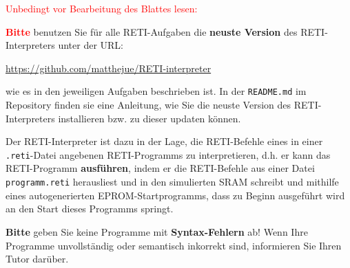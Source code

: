 \documentclass{article}
\newenvironment{adjustedminipage}[1]
{\vspace{0.1cm}\begin{minipage}[t]{#1}}
  {\end{minipage}\vspace{0.1cm}}
\begin{document}
\textcolor{red}{Unbedingt vor Bearbeitung des Blattes lesen:}

{\LARGE\bfseries\textcolor{red}{Bitte}} benutzen Sie für alle RETI-Aufgaben die \textbf{neuste Version} des RETI-Interpreters unter der URL:

\begin{center}
	\begin{adjustedminipage}{0.9\textwidth}
    \url{https://github.com/matthejue/RETI-interpreter}
	\end{adjustedminipage}
\end{center}

\sloppy

wie es in den jeweiligen Aufgaben beschrieben ist. In der \verb|README.md| im Repository finden sie eine Anleitung, wie Sie die neuste Version des RETI-Interpreters installieren bzw. zu dieser updaten können.

Der RETI-Interpreter ist dazu in der Lage, die RETI-Befehle eines in einer \verb|.reti|-Datei angebenen RETI-Programms zu interpretieren, d.h. er kann das RETI-Programm \textbf{ausführen}, indem er die RETI-Befehle aus einer Datei \texttt{programm.reti} herausliest und in den simulierten SRAM schreibt und mithilfe eines autogenerierten EPROM-Startprogramms, dass zu Beginn ausgeführt wird an den Start dieses Programms springt.


{\LARGE\bfseries\color{red}Bitte} geben Sie keine Programme mit \textbf{Syntax-Fehlern} ab! Wenn Ihre Programme unvollständig oder semantisch inkorrekt sind, informieren Sie Ihren Tutor darüber.
\end{document}
